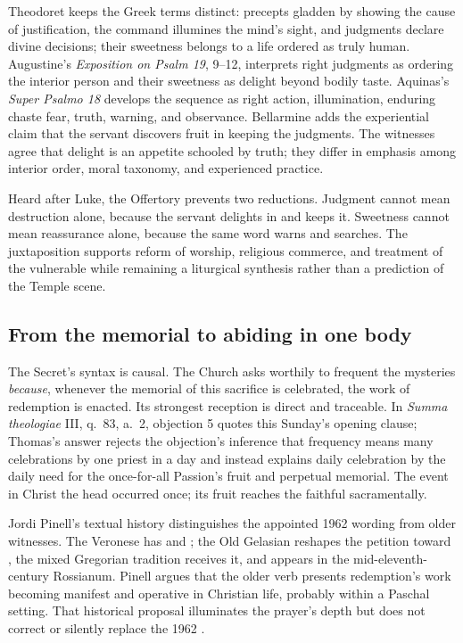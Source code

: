 \begin{deepstudy}
Theodoret keeps the Greek terms distinct: precepts gladden by showing the cause of justification, the command illumines the mind's sight, and judgments declare divine decisions; their sweetness belongs to a life ordered as truly human. Augustine's \emph{Exposition on Psalm 19}, 9--12, interprets right judgments as ordering the interior person and their sweetness as delight beyond bodily taste. Aquinas's \emph{Super Psalmo 18} develops the sequence as right action, illumination, enduring chaste fear, truth, warning, and observance. Bellarmine adds the experiential claim that the servant discovers fruit in keeping the judgments. The witnesses agree that delight is an appetite schooled by truth; they differ in emphasis among interior order, moral taxonomy, and experienced practice.

Heard after Luke, the Offertory prevents two reductions. Judgment cannot mean destruction alone, because the servant delights in and keeps it. Sweetness cannot mean reassurance alone, because the same word warns and searches. The juxtaposition supports reform of worship, religious commerce, and treatment of the vulnerable while remaining a liturgical synthesis rather than a prediction of the Temple scene.

\sectionguard
\subsection*{From the memorial to abiding in one body\enspace{}}

The Secret's syntax is causal. The Church asks worthily to frequent the mysteries \emph{because}, whenever the memorial of this sacrifice is celebrated, the work of redemption is enacted. Its strongest reception is direct and traceable. In \emph{Summa theologiae} III, q.~83, a.~2, objection 5 quotes this Sunday's opening clause; Thomas's answer rejects the objection's inference that frequency means many celebrations by one priest in a day and instead explains daily celebration by the daily need for the once-for-all Passion's fruit and perpetual memorial. The event in Christ the head occurred once; its fruit reaches the faithful sacramentally.

Jordi Pinell's textual history distinguishes the appointed 1962 wording from older witnesses. The Veronese has  and ; the Old Gelasian reshapes the petition toward , the mixed Gregorian tradition receives it, and  appears in the mid-eleventh-century Rossianum. Pinell argues that the older verb presents redemption's work becoming manifest and operative in Christian life, probably within a Paschal setting. That historical proposal illuminates the prayer's depth but does not correct or silently replace the 1962 .


\end{deepstudy}
